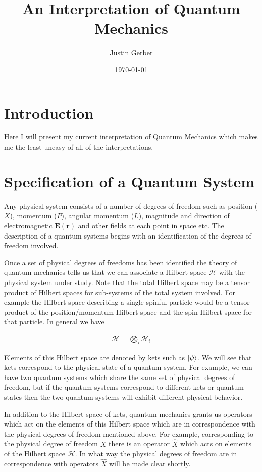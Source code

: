 \documentclass[12pt]{article}
\newcommand{\bv}[1]{\boldsymbol{#1}}
\begin{document}
\title{An Interpretation of Quantum Mechanics}
\author{Justin Gerber}
\date{\today}
\maketitle

\section{Introduction}
Here I will present my current interpretation of Quantum Mechanics which makes me the least uneasy of all of the interpretations.

\section{Specification of a Quantum System}

Any physical system consists of a number of degrees of freedom such as position ($X$), momentum ($P$), angular momentum ($L$), magnitude and direction of electromagnetic $\bv{E}(\bv{r})$ and other fields at each point in space etc. The description of a quantum systems begins with an identification of the degrees of freedom involved.

Once a set of physical degrees of freedoms has been identified the theory of quantum mechanics tells us that we can associate a Hilbert space $\mathcal{H}$ with the physical system under study. Note that the total Hilbert space may be a tensor product of Hilbert spaces for sub-systems of the total system involved. For example the Hilbert space describing a single spinful particle would be a tensor product of the position/momentum Hilbert space and the spin Hilbert space for that particle. In general we have

\begin{align}
\mathcal{H} = \bigotimes_i \mathcal{H}_i
\end{align}

Elements of this Hilbert space are denoted by kets such as $\ket{\psi}$. We will see that kets correspond to the physical state of a quantum system. For example, we can have two quantum systems which share the same set of physical degrees of freedom, but if the quantum systems correspond to different kets or quantum states then the two quantum systems will exhibit different physical behavior.

In addition to the Hilbert space of kets, quantum mechanics grants us operators which act on the elements of this Hilbert space which are in correspondence with the physical degrees of freedom mentioned above. For example, corresponding to the physical degree of freedom $X$ there is an operator $\hat{X}$ which acts on elements of the Hilbert space $\mathcal{H}$. In what way the physical degrees of freedom are in correspondence with operators $\hat{X}$ will be made clear shortly. 
\end{document}
